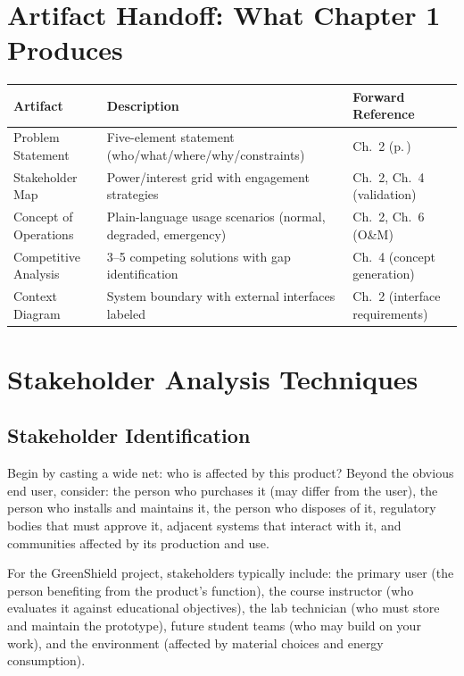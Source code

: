 \section{Artifact Handoff: What Chapter 1 Produces}
\begin{table}[htbp]\centering\small
\begin{tabularx}{\textwidth}{l X l}
\toprule
\textbf{Artifact} & \textbf{Description} & \textbf{Forward Reference} \\
\midrule
Problem Statement & Five-element statement (who/what/where/why/constraints) & Ch.~2 (p.\,\pageref{ch:value}) \\
Stakeholder Map & Power/interest grid with engagement strategies & Ch.~2, Ch.~4 (validation) \\
Concept of Operations & Plain-language usage scenarios (normal, degraded, emergency) & Ch.~2, Ch.~6 (O\&M) \\
Competitive Analysis & 3--5 competing solutions with gap identification & Ch.~4 (concept generation) \\
Context Diagram & System boundary with external interfaces labeled & Ch.~2 (interface requirements) \\
\bottomrule
\end{tabularx}
\end{table}


\section{Stakeholder Analysis Techniques}
\subsection{Stakeholder Identification}
Begin by casting a wide net: who is affected by this product? Beyond the obvious end user, consider: the person who purchases it (may differ from the user), the person who installs and maintains it, the person who disposes of it, regulatory bodies that must approve it, adjacent systems that interact with it, and communities affected by its production and use.

For the GreenShield project, stakeholders typically include: the primary user (the person benefiting from the product's function), the course instructor (who evaluates it against educational objectives), the lab technician (who must store and maintain the prototype), future student teams (who may build on your work), and the environment (affected by material choices and energy consumption).

